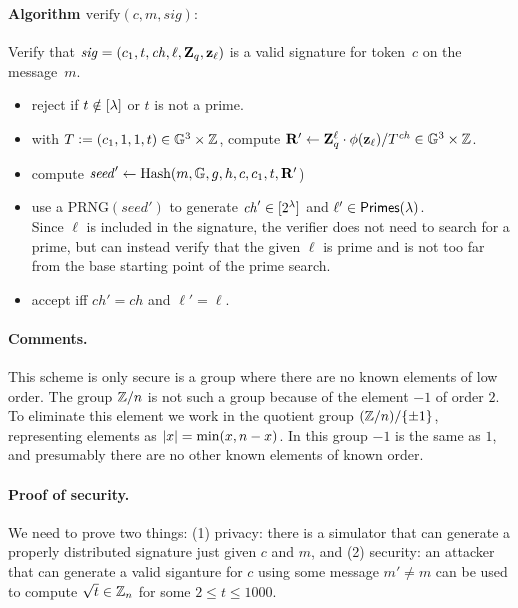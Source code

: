 \documentclass[11pt]{article}
\begin{document}
\paragraph{Algorithm $\text{verify}(c, m, \mathit{sig}):$}
Verify that $\mathit{sig} = (c_1, t, \mathit{ch}, \ell, \mathbf{Z}_q, \mathbf{z}_\ell)$ 
is a valid signature for token~$c$ on the message~$m$.
\begin{itemize}
\item reject if $t \notin [{\lambda}]$ or $t$ is not a prime.

\item with $T \mathrel{\mathop:}= (c_1, 1, 1, t) \in \mathbb G^3 \times \mathbb Z$, 
compute $\mathbf{R}' \gets \mathbf{Z}_q^\ell \cdot \phi(\mathbf{z}_\ell) / T^\mathit{ch} \in \mathbb G^3 \times \mathbb Z$.

\item compute $\mathit{seed}' \gets \text{Hash}(m, \mathbb G, g, h, c, c_1, t, \mathbf{R}'$)

\item use a $\text{PRNG}(\mathit{seed}')$ to generate 
  $\mathit{ch}' \in [{2^\lambda}]$ and $\ell' \in \textsf{Primes}(\lambda)$. \\
Since $\ell$ is
  included in the signature, the verifier does not need to search for
  a prime, but can instead verify that the given $\ell$ is prime and
  is not too far from the base starting point of the prime search.

\item accept iff $\mathit{ch}' = \mathit{ch}$ and $\ell' = \ell$.
\end{itemize}



\paragraph{Comments.}
This scheme is only secure is a group where there are no known
elements of low order.  The group $\mathbb Z/n$ is not such a group because
of the element $-1$ of order $2$.  To eliminate this element we work
in the quotient group $(\mathbb Z/n)/\{\pm 1\}$, representing elements as
$\lvert x \rvert = \min(x, n - x)$.  In this group $-1$ is the same as $1$,
and presumably there are no other known elements of known order.


\paragraph{Proof of security.}
We need to prove two things: 
(1) privacy: there is a simulator that can generate a properly distributed
signature just given $c$ and $m$, and 
(2) security: an attacker that can generate a valid siganture for $c$ using
some message $m' \neq m$ can be used to compute $\sqrt{t} \in \mathbb Z_n$
for some $2 \leq t \leq 1000$. 
\end{document}
